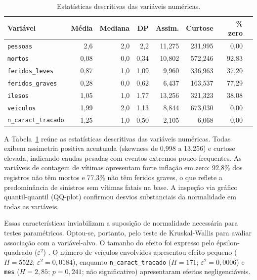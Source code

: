 \documentclass[12pt]{article}
\begin{document}
\begin{table}[ht]
\centering
\caption{Estatísticas descritivas das variáveis numéricas.}
\label{tab:numericas}
\small
\begin{tabular}{lrrrrrrr}
\toprule
\textbf{Variável} & \textbf{Média} & \textbf{Mediana} & \textbf{DP} &
  \textbf{Assim.} & \textbf{Curtose} & \textbf{\% zero} \\
\midrule
\texttt{pessoas}                  &   2,6 &   2,0 &   2,2 & 11,275 & 231,995 &  0,00 \\
\texttt{mortos}                   &   0,08 &  0,0 &   0,34 & 10,802 & 572,246 & 92,83 \\
\texttt{feridos\_leves}           &   0,87 &  1,0 &   1,09 &  9,960 & 336,963 & 37,20 \\
\texttt{feridos\_graves}          &   0,28 &  0,0 &   0,62 &  6,437 & 163,537 & 77,29 \\
\texttt{ilesos}                   &   1,05 &  1,0 &   1,77 & 13,256 & 321,323 & 38,08 \\
\texttt{veiculos}                 &   1,99 &  2,0 &   1,13 &  8,844 & 673,030 &  0,00 \\
\texttt{n\_caract\_tracado}       &   1,25 &  1,0 &   0,50 &  2,105 &   6,068 &  0,00 \\
\bottomrule
\end{tabular}
\end{table}

A Tabela~\ref{tab:numericas} reúne as estatísticas descritivas das
variáveis numéricas. Todas exibem assimetria positiva acentuada
(skewness de 0,998 a 13,256) e curtose elevada, indicando caudas
pesadas com eventos extremos pouco frequentes. As variáveis de
contagem de vítimas apresentam forte inflação em zero: 92,8\%
dos registros não têm mortos e 77,3\% não têm feridos graves, o
que reflete a predominância de sinistros sem vítimas fatais na
base. A inspeção via gráfico quantil-quantil (QQ-plot) confirmou
desvios substanciais da normalidade em todas as variáveis.



Essas características inviabilizam a suposição de normalidade
necessária para testes paramétricos. Optou-se, portanto, pelo
teste de Kruskal-Wallis \cite{kruskal:1952} para avaliar associação
com a variável-alvo. O tamanho do efeito foi expresso pelo
épsilon-quadrado ($\varepsilon^2$) \cite{tomczak:2014}. O número de
veículos envolvidos apresentou efeito pequeno
($H = 5522$; $\varepsilon^2 = 0,0184$), enquanto
\texttt{n\_caract\_tracado} ($H = 171$; $\varepsilon^2 = 0,0006$)
e \texttt{mes} ($H = 2,85$; $p = 0,241$; não significativo)
apresentaram efeitos negligenciáveis.
\end{document}
